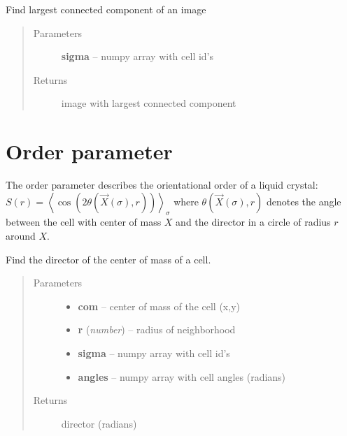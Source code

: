 \documentclass[letterpaper,10pt,english]{sphinxmanual}
\begin{document}

\begin{fulllineitems}
\label{AnalysisUtils:AnalysisUtils.getLCC}
Find largest connected component of an image
\begin{quote}\begin{description}
\item[{Parameters}] \leavevmode
\textbf{sigma} -- numpy array with cell id's

\item[{Returns}] \leavevmode
image with largest connected component

\end{description}\end{quote}

\end{fulllineitems}



\section{Order parameter}
\label{AnalysisUtils:order-parameter}
The order parameter describes the orientational order of a liquid crystal:  $S(r)=\left \langle \cos(2 \theta(\vec{X}(\sigma),r)) \right\rangle_\sigma$ where $\theta(\vec{X}(\sigma),r)$ denotes the angle between the cell with center of mass $X$ and the director in a circle of radius $r$ around $X$.

\begin{fulllineitems}
\label{AnalysisUtils:AnalysisUtils.getDirector}
Find the director of the center of mass of a cell.
\begin{quote}\begin{description}
\item[{Parameters}] \leavevmode\begin{itemize}
\item {} 
\textbf{com} -- center of mass of the cell (x,y)

\item {} 
\textbf{r} (\emph{number}) -- radius of neighborhood

\item {} 
\textbf{sigma} -- numpy array with cell id's

\item {} 
\textbf{angles} -- numpy array with cell angles (radians)

\end{itemize}

\item[{Returns}] \leavevmode
director (radians)

\end{description}\end{quote}

\end{fulllineitems}
\end{document}
